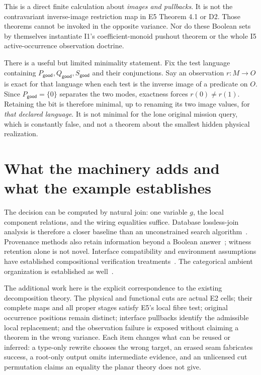 \documentclass[11pt]{article}
\newcommand{\good}{\mathsf{good}}
\begin{document}
This is a direct finite calculation about \emph{images and pullbacks}.
It is not the contravariant inverse-image restriction map in E5 Theorem 4.1
or D2. Those theorems cannot be invoked in the opposite variance. Nor do these
Boolean sets by themselves instantiate I1's coefficient-monoid pushout theorem
or the whole I5 active-occurrence observation doctrine.

There is a useful but limited minimality statement. Fix the test language
containing $P_{\good},Q_{\good},S_{\good}$ and their conjunctions. Say an
observation $r:M\to O$ is exact for that language when each test is the inverse
image of a predicate on $O$. Since $P_{\good}=\{0\}$ separates the two modes,
exactness forces $r(0)\ne r(1)$. Retaining the bit is therefore minimal, up to
renaming its two image values, for \emph{that declared language}. It is not
minimal for the lone original mission query, which is constantly false, and
not a theorem about the smallest hidden physical realization.

\section{What the machinery adds and what the example establishes}

The decision can be computed by natural join: one variable $g$, the local
component relations, and the wiring equalities suffice. Database lossless-join
analysis is therefore a closer baseline than an unconstrained search
algorithm~\cite{beeri}. Provenance methods also retain information beyond a
Boolean answer~\cite{green}; witness retention alone is not novel. Interface
compatibility and environment assumptions have established compositional
verification treatments~\cite{interface,assumptions}. The categorical ambient
organization is established as well~\cite{cruttwell}.

The additional work here is the explicit correspondence to the existing
decomposition theory. The physical and functional cuts are actual E2 cells;
their complete maps and all proper stages satisfy E5's local fibre test;
original occurrence positions remain distinct; interface pullbacks identify
the admissible local replacement; and the observation failure is exposed
without claiming a theorem in the wrong variance. Each item changes what can
be reused or inferred: a type-only rewrite chooses the wrong target, an erased
seam fabricates success, a root-only output omits intermediate evidence, and an
unlicensed cut permutation claims an equality the planar theory does not give.
\end{document}
